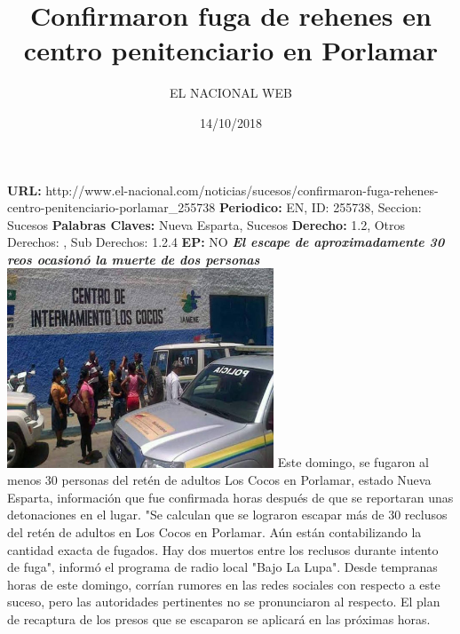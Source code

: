 \documentclass{article}%
\title{\textbf{Confirmaron fuga de rehenes en centro penitenciario en Porlamar}}%
\author{EL NACIONAL WEB}%
\date{14/10/2018}%
\begin{document}
%
\normalsize%
\maketitle%
\textbf{URL: }%
http://www.el{-}nacional.com/noticias/sucesos/confirmaron{-}fuga{-}rehenes{-}centro{-}penitenciario{-}porlamar\_255738\newline%
%
\textbf{Periodico: }%
EN, %
ID: %
255738, %
Seccion: %
Sucesos\newline%
%
\textbf{Palabras Claves: }%
Nueva Esparta, Sucesos\newline%
%
\textbf{Derecho: }%
1.2, %
Otros Derechos: %
, %
Sub Derechos: %
1.2.4\newline%
%
\textbf{EP: }%
NO\newline%
\newline%
%
\textbf{\textit{El escape de aproximadamente 30 reos ocasionó la muerte de dos personas}}%
\newline%
\newline%
%
\includegraphics[width=300px]{115.jpg}%
\newline%
%
Este domingo, se fugaron al menos 30 personas del retén de adultos Los Cocos en Porlamar, estado Nueva Esparta, información que fue confirmada horas después de que se reportaran unas detonaciones en el lugar.%
\newline%
%
"Se calculan que se lograron escapar más de 30 reclusos del retén de adultos en Los Cocos en Porlamar. Aún están contabilizando la cantidad exacta de fugados. Hay dos muertos entre los reclusos durante intento de fuga", informó el programa de radio local "Bajo La Lupa".%
\newline%
%
Desde tempranas horas de este domingo, corrían rumores en las redes sociales con respecto a este suceso, pero las autoridades pertinentes no se pronunciaron al respecto.%
\newline%
%
El plan de recaptura de los presos que se escaparon se aplicará en las próximas horas.%
\newline%
%
\end{document}
